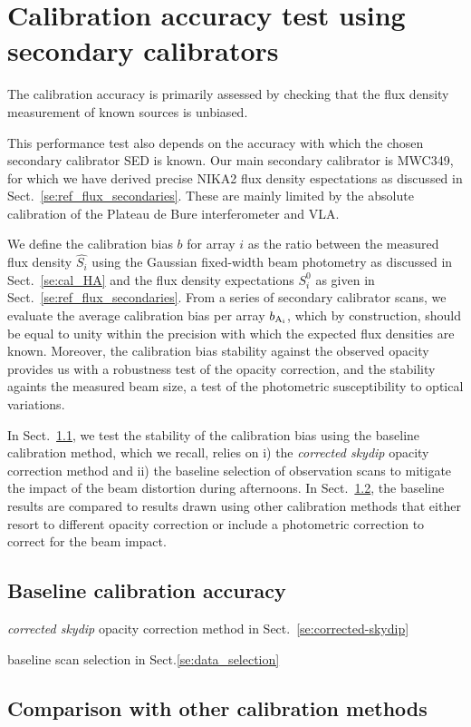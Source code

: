 

\section{Calibration accuracy test using secondary calibrators}
\label{se:calibration_bias}

The calibration accuracy is primarily assessed by checking
that the flux density measurement of known sources is unbiased.

This performance test also depends on the accuracy with which the
chosen secondary calibrator SED is known. Our main secondary
calibrator is MWC349, for which we have derived precise NIKA2 flux
density espectations as discussed in
Sect.~\ref{se:ref_flux_secondaries}.
These are mainly limited by the absolute calibration of the Plateau de
Bure interferometer and VLA.

We define the calibration bias $b$ for array $i$ as
the ratio between the measured flux density $\hat{S_{i}}$ using the
Gaussian fixed-width beam photometry as discussed in
Sect.~\ref{se:cal_HA} and the flux density expectations $S^{0}_{i}$ as
given in Sect.~\ref{se:ref_flux_secondaries}. From a series of
secondary calibrator scans, we evaluate the average calibration bias
per array $b_{\rm A_i}$, which by construction, should be equal to
unity within the precision with which the expected flux densities are
known. Moreover, the calibration bias stability against the observed
opacity provides us with a robustness test of the opacity correction,
and the stability againts the measured beam size, a test of the
photometric susceptibility to optical variations.

In Sect.~\ref{se:baseline_bias}, we test the stability of the
calibration bias using the baseline calibration method, which we
recall, relies on i) the \emph{corrected skydip} opacity correction method
and ii) the baseline selection of observation scans to mitigate the impact
of the beam distortion during afternoons. In
Sect.~\ref{se:other_bias}, the baseline results are compared to
results drawn using other calibration methods that either resort to different
opacity correction or include a photometric correction to correct for
the beam impact. 


\subsection{Baseline calibration accuracy}
\label{se:baseline_bias}


\emph{corrected skydip} opacity correction method in
Sect.~\ref{se:corrected-skydip}
 
baseline scan selection in Sect.\ref{se:data_selection} 


\subsection{Comparison with other calibration methods}
\label{se:other_bias}
